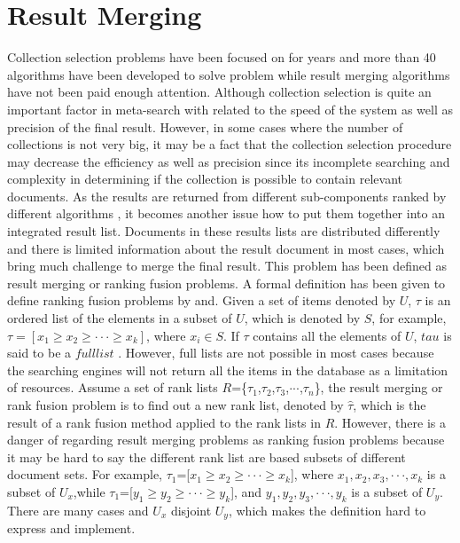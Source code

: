 \section{Result Merging} 

Collection selection problems have been focused on for years and more than 40 algorithms have been developed to solve problem while result merging algorithms have not been paid enough attention. Although collection selection is quite an important factor in meta-search with related to the speed of the system as well as precision of the final result. However, in some cases where the number of collections is not very big, it may be a fact that the collection selection procedure may decrease the efficiency as well as precision since its incomplete searching and complexity in determining if the collection is possible to contain relevant documents. As the results are returned from different sub-components ranked by different algorithms , it becomes another issue how to put them together into an integrated result list. Documents in these results lists are distributed differently and there is limited information about the result document in most cases, which bring much challenge to merge the final result. This problem has been defined as result merging or ranking fusion problems. A formal definition has been given to define ranking fusion problems by \cite{Dwork2001} and\cite{Renda2003}. Given a set of items denoted by $U$, $\tau$ is an ordered list of the elements in a subset of $U$, which is denoted by $S$, for example, $\tau =[ x_1 \geq x_2 \geq \cdotp \cdotp \cdotp \geq x_k]$, where $x_i$$\in$$S$. If $\tau$ contains all the elements of $U$, $tau$ is said to be a $full list$ . However, full lists are not possible in most cases because the searching engines will not return all the items in the database as a limitation of resources. Assume a set of rank lists $R$=\{$\tau_1$,$\tau_2$,$\tau_3$,$\cdotp$$\cdotp$$\cdotp$,$\tau_n$\}, the result merging or rank fusion problem is to find out a new rank list, denoted by $\hat{\tau}$, which is the result of a rank fusion method applied to the rank lists in $R$. However, there is a danger of regarding result merging problems as ranking fusion problems because it may be hard to say the different rank list are based subsets of different document sets. For example, $\tau_1$=[$x_1$$\geq$$x_2$$\geq$$\cdotp\cdotp\cdotp\geq$$x_k$], where $x_1,x_2,x_3,\cdotp\cdotp\cdotp,x_k$ is a subset of $U_x$,while $\tau_1$=[$y_1$$\geq$$y_2$$\geq$$\cdotp\cdotp\cdotp\geq$$y_k$], and $y_1,y_2,y_3,\cdotp\cdotp\cdotp,y_k$ is a subset of $U_y$. There are many cases and $U_x$ disjoint $U_y$, which makes the definition hard to express and implement.


